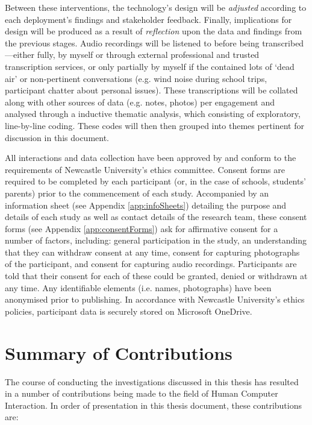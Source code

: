 Between these interventions, the technology's design will be \textit{adjusted} according to each deployment's findings and stakeholder feedback. Finally, implications for design will be produced as a result of \textit{reflection} upon the data and findings from the previous stages. Audio recordings will be listened to before being transcribed---either fully, by myself or through external professional and trusted transcription services, or only partially by myself if the contained lots of `dead air' or non-pertinent conversations (e.g. wind noise during school trips, participant chatter about personal issues). These transcriptions will be collated along with other sources of data (e.g. notes, photos) per engagement and analysed through a inductive thematic analysis, which consisting of exploratory, line-by-line coding. These codes will then then grouped into themes pertinent for discussion in this document.

All interactions and data collection have been approved by and conform to the requirements of Newcastle University’s ethics committee. Consent forms are required to be completed by each participant (or, in the case of schools, students' parents) prior to the commencement of each study. Accompanied by an information sheet (see Appendix \ref{app:infoSheets}) detailing the purpose and details of each study as well as contact details of the research team, these consent forms (see Appendix \ref{app:consentForms}) ask for affirmative consent for a number of factors, including: general participation in the study, an understanding that they can withdraw consent at any time, consent for capturing photographs of the participant, and consent for capturing audio recordings. Participants are told that their consent for each of these could be granted, denied or withdrawn at any time. Any identifiable elements (i.e. names, photographs) have been anonymised prior to publishing. In accordance with Newcastle University's ethics policies, participant data is securely stored on Microsoft OneDrive.

\section{Summary of Contributions}
The course of conducting the investigations discussed in this thesis has resulted in a number of contributions being made to the field of Human Computer Interaction. In order of presentation in this thesis document, these contributions are:

